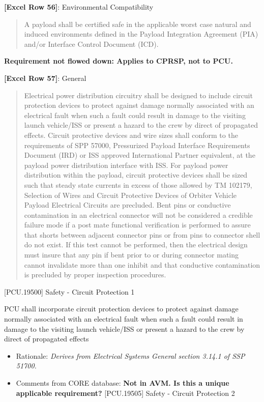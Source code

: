 \textbf{[Excel Row 56]}: Environmental Compatibility

\begin{quote}
A payload shall be certified safe in the applicable worst case natural and induced environments defined in the Payload Integration Agreement (PIA) and\slash or Interface Control Document (ICD).
\end{quote}

\textbf{Requirement not flowed down: Applies to CPRSP, not to PCU.}

\textbf{[Excel Row 57]}: General

\begin{quote}
Electrical power distribution circuitry shall be designed to include circuit protection devices to protect against damage normally associated with an electrical fault when such a fault could result in damage to the visiting launch vehicle\slash ISS or present a hazard to the crew by direct of propagated effects. Circuit protective devices and wire sizes shall conform to the requirements of SPP 57000, Pressurized Payload Interface Requirements Document (IRD) or ISS approved International Partner equivalent, at the payload power distribution interface with ISS. For payload power distribution within the payload, circuit protective devices shall be sized such that steady state currents in excess of those allowed by TM 102179, Selection of Wires and Circuit Protective Devices of Orbiter Vehicle Payload Electrical Circuits are precluded. Bent pins or conductive contamination in an electrical connector will not be considered a credible failure mode if a post mate functional verification is performed to assure that shorts between adjacent connector pins or from pins to connector shell do not exist. If this test cannot be performed, then the electrical design must insure that any pin if bent prior to or during connector mating cannot invalidate more than one inhibit and that conductive contamination is precluded by proper inspection procedures.
\end{quote}

[PCU.19500] Safety - Circuit Protection 1

PCU shall incorporate circuit protection devices to protect against damage normally associated with an electrical fault when such a fault could result in damage to the visiting launch vehicle\slash ISS or present a hazard to the crew by direct of propagated effects

\begin{itemize}
\item{} Rationale: \emph{Derives from Electrical Systems General section 3.14.1 of SSP 51700.}

\item{} Comments from CORE database: \textbf{\textbf{Not in AVM. Is this a unique applicable requirement?}}
[PCU.19505] Safety - Circuit Protection 2

\end{itemize}

